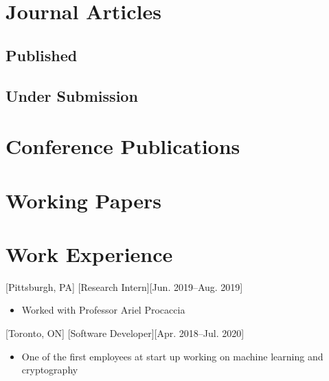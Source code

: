 \documentclass{article}
\begin{document}
	\section{Journal Articles}
	\subsection{Published}
	
    \begin{etaremune}
    [itemsep=-.5ex,
    	leftmargin=3.5ex]
        
    \end{etaremune}
    
    \subsection{Under Submission}
    \begin{etaremune}
    [itemsep=-.5ex,
    	leftmargin=3.5ex]
        
    \end{etaremune}
    


    \section{Conference Publications}
    \begin{etaremune}
    	[itemsep=-.5ex,
    	leftmargin=3.5ex]
        
    \end{etaremune}
    
    \section{Working Papers}
    \begin{etaremune}
    	[itemsep=-.5ex,
    	leftmargin=3.5ex]
        
    \end{etaremune}
    
    \section{Work Experience}
    [Pittsburgh, PA]
    [Research Intern][Jun. 2019--Aug. 2019]
    \begin{itemize}[noitemsep,nolistsep]
        \item Worked with Professor Ariel Procaccia
    \end{itemize}

    [Toronto, ON]
    [Software Developer][Apr. 2018--Jul. 2020]
    \begin{itemize}[noitemsep,nolistsep]
        \item One of the first employees at start up working on machine learning and cryptography
    \end{itemize}
\end{document}
